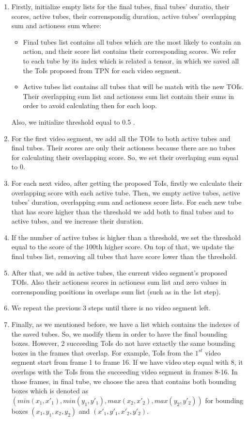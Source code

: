 \documentclass{report}
\begin{document}
\begin{enumerate}
\item Firstly,  initialize empty lists for the final tubes, final tubes' duratio, their scores, active tubes, their correnspondig duration,
  active tubes' overlapping sum and actioness sum where:
  \begin{itemize}
  \item Final tubes list contains all tubes which are the most likely to contain an action, and their score list contains their
    corresponding scores. We refer to each tube by its index which is related a tensor, in which we saved all the ToIs proposed
    from TPN for each video segment.
  \item Active tubes list contains all tubes that will be match with the new TOIs. Their overlapping sum list and actioness sum list
    contain their sums in order to avoid calculating then for each loop. 
  \end{itemize}
Also, we initialize threshold equal to 0.5 .
\item For the first video segment, we add all the TOIs to both active tubes and final tubes. Their scores are only their actioness because
  there are no tubes for calculating their overlapping score. So, we set their overlaping sum equal to 0.
\item For each next video, after getting the proposed ToIs, firstly we calculate their overlapping score with each active tube. Then, we
  empty active tubes, active tubes' duration, overlapping sum and actioness score lists.  For each new tube that has score higher than the threshold
  we add both to final tubes and to active tubes, and we increase their duration.
\item If the number of active tubes is higher than a threshold, we set the threshold equal to the score of
  the 100th higher score. On top of that, we update the final tubes list, removing all tubes that have score lower than the threshold.
\item After that, we add in active tubes, the current video segment's proposed TOIs. Also their actioness scores in actioness sum list and
  zero values in corrensponding positions in overlaps sum list (such as in the 1st step).
\item We repeat the previous 3 steps until there is no video segment left.
\item Finally, as we mentioned before, we have a list which contains the indexes of the saved tubes. So, we modify them in order to have
  the final bounding boxes. However, 2 succeeding ToIs do not have extactly the same bounding boxes in the frames that overlap. For example,
  ToIs from the $1^{st}$ video segment start from frame 1 to frame 16. If we have video step equal with 8, it overlaps with the ToIs from the
  succeeding video segment in frames 8-16. In those frames, in final tube, we choose the area that contains both bounding boxes which is
  denoted as $(min(x_1,x'_1), min(y_1,y'_1), max(x_2,x'_2), max(y_2,y'_2))$ for bounding boxes $(x_1,y_1,x_2,y_2)$ and $(x'_1,y'_1,x'_2,y'_2)$.
\end{enumerate}
\end{document}
